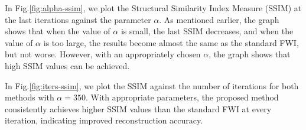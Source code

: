 
In Fig.\ref{fig:alpha-ssim}, we plot the Structural Similarity Index Measure (SSIM) at the last iterations against the parameter $\alpha$.
As mentioned earlier, the graph shows that when the value of $\alpha$ is small, the last SSIM decreases, and when the value of $\alpha$ is too large, the results become almost the same as the standard FWI, but not worse.
However, with an appropriately chosen $\alpha$, the graph shows that high SSIM values can be achieved.


In Fig.\ref{fig:iters-ssim}, we plot the SSIM against the number of iterations for both methods with $\alpha=350$.
With appropriate parameters, the proposed method consistently achieves higher SSIM values than the standard FWI at every iteration, indicating improved reconstruction accuracy.

